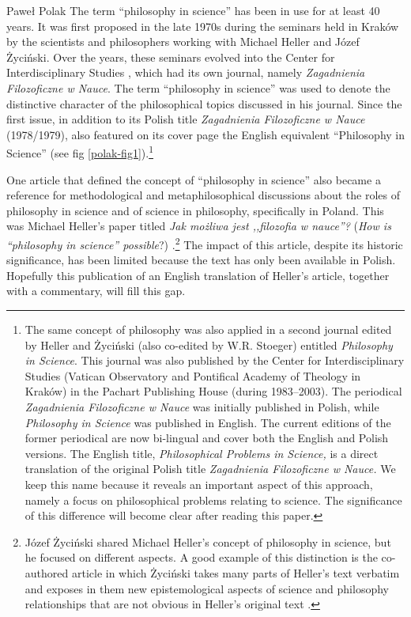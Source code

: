 \begin{artengenv}{Paweł Polak}
\lettrine[loversize=0.13,lines=2,lraise=-0.05,nindent=0em,findent=0.2pt]%
{T}{}he term ``philosophy in science'' has been in use for at least 40 years. It was first proposed in the late 1970s during
the seminars held in Kraków by the scientists and philosophers working with Michael Heller and Józef Życiński. Over the
years, these seminars evolved into the Center for Interdisciplinary Studies
\parencite{pol_trombik_origin_2019},
which had its own journal, namely \textit{Zagadnienia Filozoficzne w Nauce}. The term ``philosophy in science''
was used to denote the distinctive character of the philosophical topics discussed in his journal. Since the first
issue, in addition to its Polish title \textit{Zagadnienia Filozoficzne w Nauce} (1978/1979), also featured on its
cover page the English equivalent ``Philosophy in Science'' (see fig \ref{polak-fig1}).\footnote{The same concept of philosophy was
also applied in a second journal edited by Heller and Życiński (also co-edited by W.R. Stoeger) entitled
\textit{Philosophy in Science}. This journal was also published by the Center for Interdisciplinary Studies (Vatican
Observatory and Pontifical Academy of Theology in Kraków) in the Pachart Publishing House (during 1983–2003). The
periodical \textit{Zagadnienia Filozoficzne w Nauce} was initially published in Polish, while \textit{Philosophy in
Science }was published in English. The current editions of the former periodical are now bi-lingual and cover both the
English and Polish versions. The English title, \textit{Philosophical Problems in Science,} is a direct translation of
the original Polish title \textit{Zagadnienia Filozoficzne w Nauce. }We keep this name because it reveals an important
aspect of this approach, namely a focus on philosophical problems relating to science. The significance of this
difference will become clear after reading this paper.}



One article that defined the concept of ``philosophy in science'' also became a reference for methodological and
metaphilosophical discussions about the roles of philosophy in science and of science in philosophy, specifically in
Poland. This was Michael Heller’s paper titled \textit{Jak możliwa jest ,,filozofia w nauce''?} (\textit{How is ``philosophy
in science'' possible}?)
\parencite{pol_heller_jak_1986}.\footnote{Józef Życiński shared Michael Heller's concept
of philosophy in science, but he focused on different aspects. A good example of this distinction is the co-authored
article in which Życiński takes many parts of Heller's text verbatim and exposes in them new epistemological aspects of
science and philosophy relationships that are not obvious in Heller’s original text
\parencite{pol_heller_epistemologiczne_1987}.
} The impact of this article, despite its historic significance, has been limited because the text
has only been available in Polish. Hopefully this publication of an English translation of Heller’s article, together
with a commentary, will fill this gap.


\end{artengenv}
